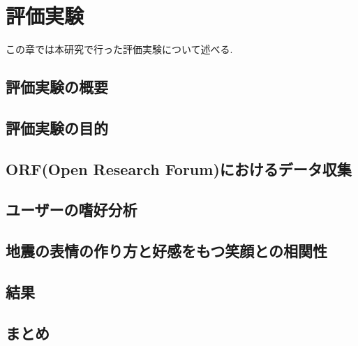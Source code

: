 \chapter{評価実験}
\label{chap:main_experiment}

この章では本研究で行った評価実験について述べる.

\section{評価実験の概要}
\section{評価実験の目的}
\section{ORF(Open Research Forum)におけるデータ収集}
\section{ユーザーの嗜好分析}

\section{地震の表情の作り方と好感をもつ笑顔との相関性}
\section{結果}
\section{まとめ}
